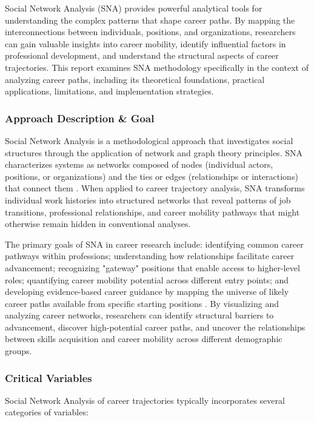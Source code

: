 \documentclass[../main.tex]{subfiles}
\begin{document}
Social Network Analysis (SNA) provides powerful analytical tools for understanding the complex patterns that shape career paths. By mapping the interconnections between individuals, positions, and organizations, researchers can gain valuable insights into career mobility, identify influential factors in professional development, and understand the structural aspects of career trajectories. This report examines SNA methodology specifically in the context of analyzing career paths, including its theoretical foundations, practical applications, limitations, and implementation strategies.

\subsubsection{Approach Description \& Goal}

Social Network Analysis is a methodological approach that investigates social structures through the application of network and graph theory principles. SNA characterizes systems as networks composed of nodes (individual actors, positions, or organizations) and the ties or edges (relationships or interactions) that connect them \citep{wikipedia_sna}. When applied to career trajectory analysis, SNA transforms individual work histories into structured networks that reveal patterns of job transitions, professional relationships, and career mobility pathways that might otherwise remain hidden in conventional analyses.

The primary goals of SNA in career research include: identifying common career pathways within professions; understanding how relationships facilitate career advancement; recognizing "gateway" positions that enable access to higher-level roles; quantifying career mobility potential across different entry points; and developing evidence-based career guidance by mapping the universe of likely career paths available from specific starting positions \citep{clochard_network_2022}. By visualizing and analyzing career networks, researchers can identify structural barriers to advancement, discover high-potential career paths, and uncover the relationships between skills acquisition and career mobility across different demographic groups.

\subsubsection{Critical Variables}

Social Network Analysis of career trajectories typically incorporates several categories of variables:
\end{document}
